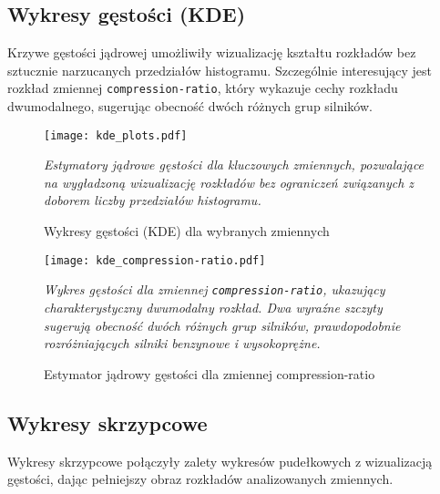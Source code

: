 \documentclass[12pt,a4paper]{article}
\begin{document}
\subsection{Wykresy gęstości (KDE)}

Krzywe gęstości jądrowej umożliwiły wizualizację kształtu rozkładów bez sztucznie narzucanych przedziałów histogramu. Szczególnie interesujący jest rozkład zmiennej \texttt{compression-ratio}, który wykazuje cechy rozkładu dwumodalnego, sugerując obecność dwóch różnych grup silników.

\begin{figure}[H]
    \centering
    \texttt{[image: kde\_plots.pdf]}
    \caption{Wykresy gęstości (KDE) dla wybranych zmiennych}
    \label{fig:kde_plots}
    \small\textit{Estymatory jądrowe gęstości dla kluczowych zmiennych, pozwalające na wygładzoną wizualizację rozkładów bez ograniczeń związanych z doborem liczby przedziałów histogramu.}
\end{figure}

\begin{figure}[H]
    \centering
    \texttt{[image: kde\_compression-ratio.pdf]}
    \caption{Estymator jądrowy gęstości dla zmiennej compression-ratio}
    \label{fig:kde_compression_detail}
    \small\textit{Wykres gęstości dla zmiennej \texttt{compression-ratio}, ukazujący charakterystyczny dwumodalny rozkład. Dwa wyraźne szczyty sugerują obecność dwóch różnych grup silników, prawdopodobnie rozróżniających silniki benzynowe i wysokoprężne.}
\end{figure}

\subsection{Wykresy skrzypcowe}

Wykresy skrzypcowe połączyły zalety wykresów pudełkowych z wizualizacją gęstości, dając pełniejszy obraz rozkładów analizowanych zmiennych.
\end{document}
